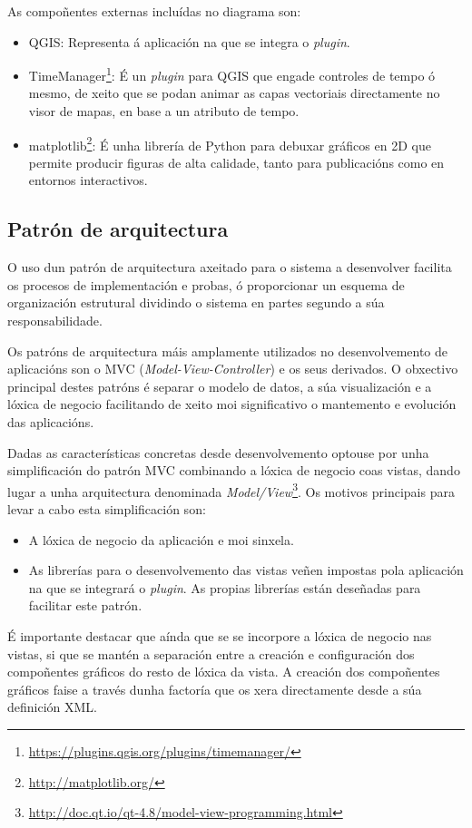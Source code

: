 As compoñentes externas incluídas no diagrama son:
\begin{itemize}
\item QGIS: Representa á aplicación na que se integra o \emph{plugin}.
\item TimeManager\footnote{\url{https://plugins.qgis.org/plugins/timemanager/}}: É un \emph{plugin} para QGIS que engade controles de tempo ó mesmo, de xeito que se podan animar as capas vectoriais directamente no visor de mapas, en base a un atributo de tempo.
\item matplotlib\footnote{\url{http://matplotlib.org/}}: É unha librería de Python para debuxar gráficos en 2D que permite producir figuras de alta calidade, tanto para publicacións como en entornos interactivos.
\end{itemize}

\subsection{Patrón de arquitectura}
O uso dun patrón de arquitectura axeitado para o sistema a desenvolver facilita os procesos de implementación e probas, ó proporcionar un esquema de organización estrutural dividindo o sistema en partes segundo a súa responsabilidade.

Os patróns de arquitectura máis amplamente utilizados no desenvolvemento de aplicacións son o MVC (\emph{Model-View-Controller}) e os seus derivados. O obxectivo principal destes patróns é separar o modelo de datos, a súa visualización e a lóxica de negocio facilitando de xeito moi significativo o mantemento e evolución das aplicacións.

Dadas as características concretas desde desenvolvemento optouse por unha simplificación do patrón MVC combinando a lóxica de negocio coas vistas, dando lugar a unha arquitectura denominada \emph{Model/View}\footnote{\url{http://doc.qt.io/qt-4.8/model-view-programming.html}}. Os motivos principais para levar a cabo esta simplificación son:
\begin{itemize}
\item A lóxica de negocio da aplicación e moi sinxela.
\item As librerías para o desenvolvemento das vistas veñen impostas pola aplicación na que se integrará o \emph{plugin}. As propias librerías están deseñadas para facilitar este patrón.
\end{itemize}

É importante destacar que aínda que se se incorpore a lóxica de negocio nas vistas, si que se mantén a separación entre a creación e configuración dos compoñentes gráficos do resto de lóxica da vista. A creación dos compoñentes gráficos faise a través dunha factoría que os xera directamente desde a súa definición XML.

